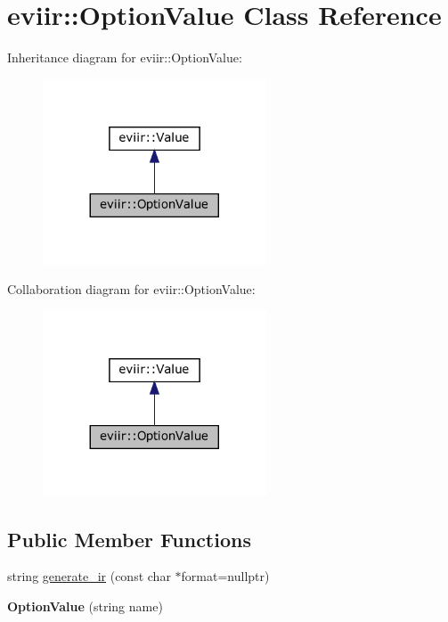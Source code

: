 \hypertarget{classeviir_1_1OptionValue}{}\section{eviir\+:\+:Option\+Value Class Reference}
\label{classeviir_1_1OptionValue}


Inheritance diagram for eviir\+:\+:Option\+Value\+:\nopagebreak
\begin{figure}[H]
\begin{center}
\leavevmode
\includegraphics[width=188pt]{classeviir_1_1OptionValue__inherit__graph}
\end{center}
\end{figure}


Collaboration diagram for eviir\+:\+:Option\+Value\+:\nopagebreak
\begin{figure}[H]
\begin{center}
\leavevmode
\includegraphics[width=188pt]{classeviir_1_1OptionValue__coll__graph}
\end{center}
\end{figure}
\subsection*{Public Member Functions}
\begin{DoxyCompactItemize}
\item 
string \hyperlink{classeviir_1_1OptionValue_abb9e9cbaa9f6c0af697e5cbea035f56a}{generate\+\_\+ir} (const char $\ast$format=nullptr)
\item 
\mbox{\label{classeviir_1_1OptionValue_a471275196d5d4d074a3a0af18ca78210}} 
{\bfseries Option\+Value} (string name)
\end{DoxyCompactItemize}
